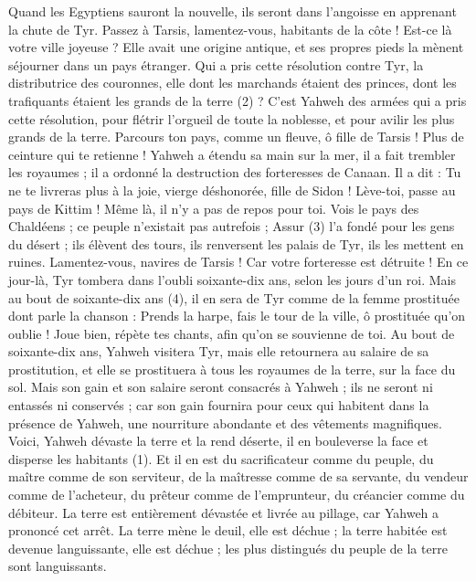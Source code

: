 \begin{multicols}{2}
Quand les Egyptiens sauront la nouvelle, ils seront dans l’angoisse en apprenant la chute de Tyr.
Passez à Tarsis, lamentez-vous, habitants de la côte !
Est-ce là votre ville joyeuse ? Elle avait une origine antique, et ses propres pieds la mènent séjourner dans un pays étranger.
Qui a pris cette résolution contre Tyr, la distributrice des couronnes, elle dont les marchands étaient des princes, dont les trafiquants étaient les grands de la terre (2) ?
C’est Yahweh des armées qui a pris cette résolution, pour flétrir l'orgueil de toute la noblesse, et pour avilir les plus grands de la terre.
Parcours ton pays, comme un fleuve, ô fille de Tarsis ! Plus de ceinture qui te retienne !
Yahweh a étendu sa main sur la mer, il a fait trembler les royaumes ; il a ordonné la destruction des forteresses de Canaan.
Il a dit : Tu ne te livreras plus à la joie, vierge déshonorée, fille de Sidon ! Lève-toi, passe au pays de Kittim ! Même là, il n’y a pas de repos pour toi.
Vois le pays des Chaldéens ; ce peuple n’existait pas autrefois ; Assur (3) l'a fondé pour les gens du désert ; ils élèvent des tours, ils renversent les palais de Tyr, ils les mettent en ruines.
Lamentez-vous, navires de Tarsis ! Car votre forteresse est détruite !
En ce jour-là, Tyr tombera dans l’oubli soixante-dix ans, selon les jours d'un roi. Mais au bout de soixante-dix ans (4), il en sera de Tyr comme de la femme prostituée dont parle la chanson :
Prends la harpe, fais le tour de la ville, ô prostituée qu’on oublie ! Joue bien, répète tes chants, afin qu'on se souvienne de toi.
Au bout de soixante-dix ans, Yahweh visitera Tyr, mais elle retournera au salaire de sa prostitution, et elle se prostituera à tous les royaumes de la terre, sur la face du sol.
Mais son gain et son salaire seront consacrés à Yahweh ; ils ne seront ni entassés ni conservés ; car son gain fournira pour ceux qui habitent dans la présence de Yahweh, une nourriture abondante et des vêtements magnifiques.
\VerseOne{}Voici, Yahweh dévaste la terre et la rend déserte, il en bouleverse la face et disperse les habitants (1).
Et il en est du sacrificateur comme du peuple, du maître comme de son serviteur, de la maîtresse comme de sa servante, du vendeur comme de l'acheteur, du prêteur comme de l’emprunteur, du créancier comme du débiteur.
La terre est entièrement dévastée et livrée au pillage, car Yahweh a prononcé cet arrêt.
La terre mène le deuil, elle est déchue ; la terre habitée est devenue languissante, elle est déchue ; les plus distingués du peuple de la terre sont languissants.

\end{multicols}
